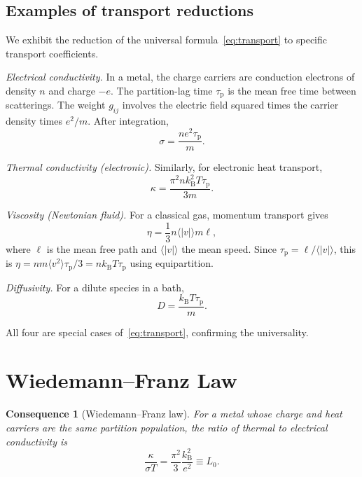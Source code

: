 \documentclass[11pt,twocolumn,a4paper]{article}
\theoremstyle{axiomstyle}
\theoremstyle{conseqstyle}
\newtheorem{consequence}{Consequence}
\theoremstyle{definition}
\theoremstyle{remark}
\newcommand{\kB}{k_{\mathrm{B}}}
\newcommand{\taup}{\tau_{\mathrm{p}}}
\begin{document}
\subsection{Examples of transport reductions}

We exhibit the reduction of the universal formula~\eqref{eq:transport} to specific transport coefficients.

\emph{Electrical conductivity.} In a metal, the charge carriers are conduction electrons of density $n$ and charge $-e$. The partition-lag time $\taup$ is the mean free time between scatterings. The weight $g_{ij}$ involves the electric field squared times the carrier density times $e^{2}/m$. After integration,
\begin{equation*}
\sigma=\frac{ne^{2}\taup}{m}.
\end{equation*}

\emph{Thermal conductivity (electronic).} Similarly, for electronic heat transport,
\begin{equation*}
\kappa=\frac{\pi^{2}n\kB^{2}T\taup}{3m}.
\end{equation*}

\emph{Viscosity (Newtonian fluid).} For a classical gas, momentum transport gives
\begin{equation*}
\eta=\frac{1}{3}n\langle |v|\rangle m\ell,
\end{equation*}
where $\ell$ is the mean free path and $\langle |v|\rangle$ the mean speed. Since $\taup=\ell/\langle |v|\rangle$, this is $\eta=nm\langle v^{2}\rangle\taup/3=n\kB T\taup$ using equipartition.

\emph{Diffusivity.} For a dilute species in a bath,
\begin{equation*}
D=\frac{\kB T\taup}{m}.
\end{equation*}

All four are special cases of~\eqref{eq:transport}, confirming the universality.

\section{Wiedemann--Franz Law}
\label{sec:wiedemann}

\begin{consequence}[Wiedemann--Franz law]
\label{cons:wiedemann}
For a metal whose charge and heat carriers are the same partition population, the ratio of thermal to electrical conductivity is
\begin{equation}
\frac{\kappa}{\sigma T}=\frac{\pi^{2}}{3}\frac{\kB^{2}}{e^{2}}\equiv L_{0}.
\label{eq:wiedemann}
\end{equation}
\end{consequence}
\end{document}
